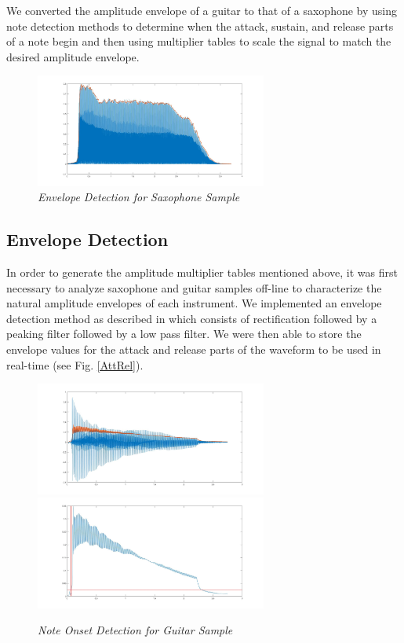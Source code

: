 \documentclass[twoside,a4paper]{article}
\begin{document}
\noindent
We converted the amplitude envelope of a
guitar to that of a saxophone by using note detection methods to determine when
the attack, sustain, and release parts of a note begin
and then using multiplier
tables to scale the signal to match the desired amplitude envelope.

\begin{figure}[ht]
  \includegraphics[width=3in]{Pictures/EnvDetection.jpg}
  \centering
  \caption{\label{SaxEnv} {\it Envelope Detection for Saxophone Sample}}
  \end{figure}

\subsection{Envelope Detection}
In order to generate the amplitude multiplier tables mentioned above,
it was first necessary to analyze saxophone and guitar samples off-line
to characterize the natural amplitude envelopes of each instrument. We
implemented an envelope detection method as described in \cite{DBLP:journals/corr/Jarne17}
which consists of rectification followed by a peaking filter followed by a low pass filter.
We were then able to store the envelope values for the attack and release parts of the waveform
to be used in real-time (see Fig. \ref{AttRel}).

\begin{figure}[ht]
  \includegraphics[width=3in]{Pictures/NoteDetect1.jpg}
  \includegraphics[width=3in]{Pictures/NoteDetect2.jpg}
  \caption{\label{Onset} {\it Note Onset Detection for Guitar Sample}}
  \centering
  \end{figure}
\end{document}
